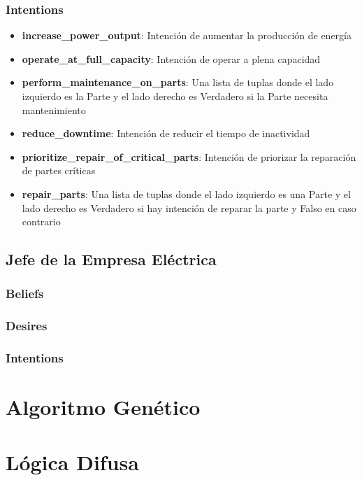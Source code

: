 \documentclass[twocolumn, fontsize=10pt]{article}
\begin{document}
\subsubsection{Intentions}

\begin{itemize}
  \item \textbf{increase\_power\_output}: Intención de aumentar la producción de energía
  \item \textbf{operate\_at\_full\_capacity}: Intención de operar a plena capacidad
  \item \textbf{perform\_maintenance\_on\_parts}: Una lista de tuplas donde el lado izquierdo es la Parte y el lado derecho es Verdadero si la Parte necesita mantenimiento
  \item \textbf{reduce\_downtime}: Intención de reducir el tiempo de inactividad
  \item \textbf{prioritize\_repair\_of\_critical\_parts}: Intención de priorizar la reparación de partes críticas
  \item \textbf{repair\_parts}: Una lista de tuplas donde el lado izquierdo es una Parte y el lado derecho es Verdadero si hay intención de reparar la parte y Falso en caso contrario

\end{itemize}

\subsection{Jefe de la Empresa Eléctrica}

\subsubsection{Beliefs}

\subsubsection{Desires}
\subsubsection{Intentions}

\section{Algoritmo Genético}

\section{Lógica Difusa}
\end{document}
